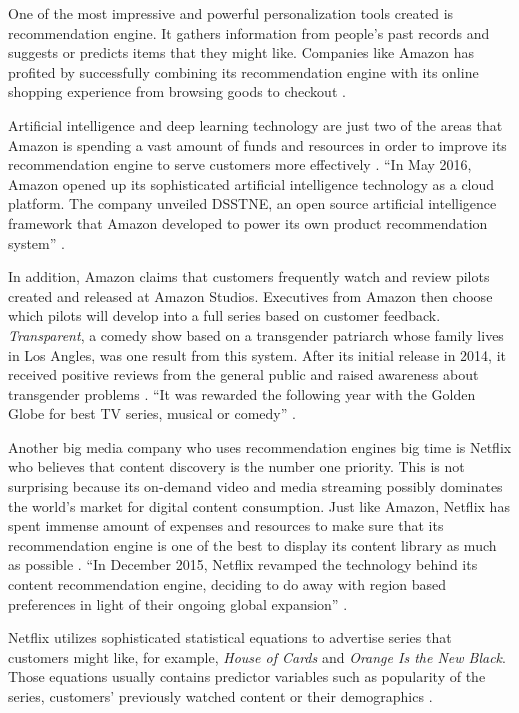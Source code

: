 One of the most impressive and powerful personalization tools created is recommendation engine. It gathers information from people's past records and suggests or predicts items that they might like. Companies like Amazon has profited by successfully combining its recommendation engine with its online shopping experience from browsing goods to checkout \cite{Arora2016battle}.  

Artificial intelligence and deep learning technology are just two of the areas that Amazon is spending a vast amount of funds and resources in order to improve its recommendation engine to serve customers more effectively \cite{Arora2016battle}. ``In May 2016, Amazon opened up its sophisticated artificial intelligence technology as a cloud platform. The company unveiled DSSTNE, an open source artificial intelligence framework that Amazon developed to power its own product recommendation system'' \cite{Arora2016battle}.

In addition, Amazon claims that customers frequently watch and review pilots created and released at Amazon Studios. Executives from Amazon then choose which pilots will develop into a full series based on customer feedback. {\em Transparent}, a comedy show based on a transgender patriarch whose family lives in Los Angles, was one result from this system. After its initial release in 2014, it received positive reviews from the general public and raised awareness about transgender problems \cite{Whitley2016data}. ``It was rewarded the following year with the Golden Globe for best TV series, musical or comedy'' \cite{Whitley2016data}.

Another big media company who uses recommendation engines big time is Netflix who believes that content discovery is the number one priority. This is not surprising because its on-demand video and media streaming possibly dominates the world's market for digital content consumption. Just like Amazon, Netflix has spent immense amount of expenses and resources to make sure that its recommendation engine is one of the best to display its content library as much as possible \cite{Arora2016battle}. ``In December 2015, Netflix revamped the technology behind its content recommendation engine, deciding to do away with region based preferences in light of their ongoing global expansion'' \cite{Arora2016battle}.

Netflix utilizes sophisticated statistical equations to advertise series that customers might like, for example, {\em House of Cards} and {\em Orange Is the New Black}. Those equations usually contains predictor variables such as popularity of the series, customers' previously watched content or their demographics \cite{Whitley2016data}.

